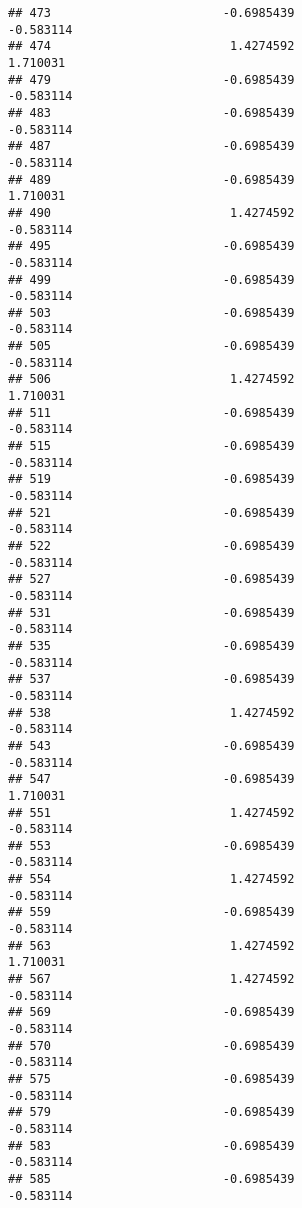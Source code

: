 \documentclass[
]{article}
\begin{document}
\begin{verbatim}
## 473                        -0.6985439                        -0.583114
## 474                         1.4274592                         1.710031
## 479                        -0.6985439                        -0.583114
## 483                        -0.6985439                        -0.583114
## 487                        -0.6985439                        -0.583114
## 489                        -0.6985439                         1.710031
## 490                         1.4274592                        -0.583114
## 495                        -0.6985439                        -0.583114
## 499                        -0.6985439                        -0.583114
## 503                        -0.6985439                        -0.583114
## 505                        -0.6985439                        -0.583114
## 506                         1.4274592                         1.710031
## 511                        -0.6985439                        -0.583114
## 515                        -0.6985439                        -0.583114
## 519                        -0.6985439                        -0.583114
## 521                        -0.6985439                        -0.583114
## 522                        -0.6985439                        -0.583114
## 527                        -0.6985439                        -0.583114
## 531                        -0.6985439                        -0.583114
## 535                        -0.6985439                        -0.583114
## 537                        -0.6985439                        -0.583114
## 538                         1.4274592                        -0.583114
## 543                        -0.6985439                        -0.583114
## 547                        -0.6985439                         1.710031
## 551                         1.4274592                        -0.583114
## 553                        -0.6985439                        -0.583114
## 554                         1.4274592                        -0.583114
## 559                        -0.6985439                        -0.583114
## 563                         1.4274592                         1.710031
## 567                         1.4274592                        -0.583114
## 569                        -0.6985439                        -0.583114
## 570                        -0.6985439                        -0.583114
## 575                        -0.6985439                        -0.583114
## 579                        -0.6985439                        -0.583114
## 583                        -0.6985439                        -0.583114
## 585                        -0.6985439                        -0.583114

\end{verbatim}
\end{document}
